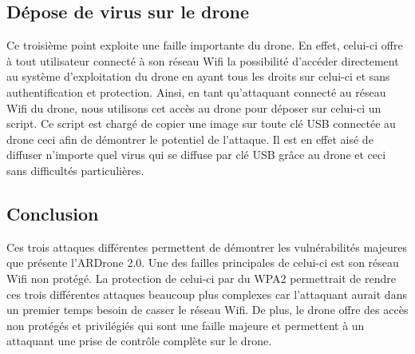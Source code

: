 \subsection{Dépose de virus sur le drone}
Ce troisième point exploite une faille importante du drone. En effet, celui-ci offre à tout utilisateur connecté à son réseau Wifi la possibilité d'accéder directement au système d'exploitation du drone en ayant tous les droits sur celui-ci et sans authentification et protection. Ainsi, en tant qu'attaquant connecté au réseau Wifi du drone, nous utilisons cet accès au drone pour déposer sur celui-ci un script. Ce script est chargé de copier une image sur toute clé USB connectée au drone ceci afin de démontrer le potentiel de l'attaque. Il est en effet aisé de diffuser n'importe quel virus qui se diffuse par clé USB grâce au drone et ceci sans difficultés particulières.

\subsection{Conclusion}
Ces trois attaques différentes permettent de démontrer les vulnérabilités majeures que présente l'ARDrone 2.0. Une des failles principales de celui-ci est son réseau Wifi non protégé. La protection de celui-ci par du WPA2 permettrait de rendre ces trois différentes attaques beaucoup plus complexes car l'attaquant aurait dans un premier temps besoin de casser le réseau Wifi. De plus, le drone offre des accès non protégés et privilégiés qui sont une faille majeure et permettent à un attaquant une prise de contrôle complète sur le drone.
